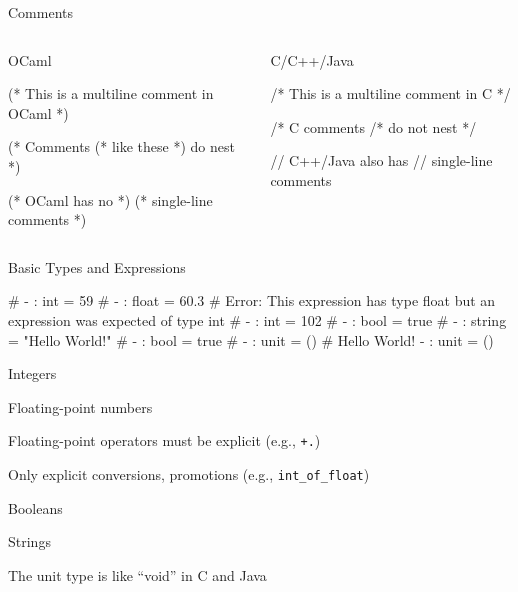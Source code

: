 \documentclass{plt}
\begin{document}
\begin{frame}[fragile]{Comments}

  \begin{columns}
    \begin{column}[t]{0.5\textwidth}
OCaml
\begin{ocaml}
(* This is a multiline
   comment in OCaml *)

(* Comments
    (* like these *)
   do nest
*)

(* OCaml has no *)
(* single-line comments *)
\end{ocaml}
    \end{column}
    \begin{column}[t]{0.5\textwidth}
C/C++/Java
\begin{C}
/* This is a multiline
   comment in C */

/* C comments
     /* do not
   nest
 */

// C++/Java also has
// single-line comments
\end{C}
    \end{column}
  \end{columns}
\end{frame}

\begin{frame}[fragile]{Basic Types and Expressions}
\begin{minipage}{0.5\textwidth}
\begin{interactive}
# 
- : int = 59
\li
# 
- : float = 60.3
\li
# 
Error: This expression has type 
float but an expression was 
expected of type int
\li
# 
- : int = 102
\li
# 
- : bool = true
\li
# 
- : string = "Hello World!"
\li
# 
- : bool = true
\li
# \type{();;}
- : unit = ()
\li
# 
Hello World!
- : unit = ()
\end{interactive}
\end{minipage}\hfill%
\begin{minipage}{0.41\textwidth}
  \vspace{-60pt}
  \baselineskip
  \raggedright
  Integers

  Floating-point numbers
  
  Floating-point operators must be explicit (e.g., \texttt{+.})

  Only explicit conversions, promotions  (e.g., \texttt{int\_of\_float})

  Booleans

  Strings  
   
  The unit type is like ``void'' in C and Java
\end{minipage}
\end{frame}
\end{document}
